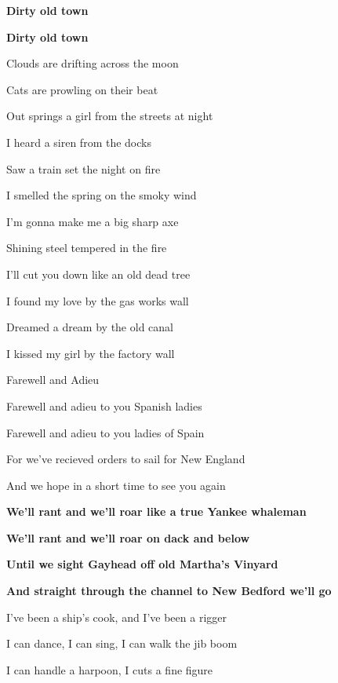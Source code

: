\documentclass[letterpaper,9pt]{article}
\begin{document}
\textbf{Dirty old town}

\textbf{Dirty old town}

\hfill

Clouds are drifting across the moon

Cats are prowling on their beat

Out springs a girl from the streets at night

\hfill

I heard a siren from the docks

Saw a train set the night on fire

I smelled the spring on the smoky wind

\hfill

I'm gonna make me a big sharp axe

Shining steel tempered in the fire

I'll cut you down like an old dead tree

\hfill

I found my love by the gas works wall

Dreamed a dream by the old canal

I kissed my girl by the factory wall

\newpage
{}
\huge
Farewell and Adieu\\

\hfill

\LARGE
Farewell and adieu to you Spanish ladies

Farewell and adieu to you ladies of Spain

For we’ve recieved orders to sail for New England

And we hope in a short time to see you again

\hfill

\textbf{We’ll rant and we’ll roar like a true Yankee whaleman
}

\textbf{We’ll rant and we’ll roar on dack and below
}

\textbf{Until we sight Gayhead off old Martha’s Vinyard
}

\textbf{And straight through the channel to New Bedford we’ll go
}

\hfill

I’ve been a ship’s cook, and I’ve been a rigger

I can dance, I can sing, I can walk the jib boom

I can handle a harpoon, I cuts a fine figure 
\end{document}
